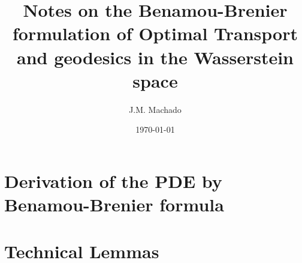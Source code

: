 \documentclass{amsart}
\title[]{Notes on the Benamou-Brenier formulation of Optimal Transport and geodesics in the Wasserstein space}
\author{J.M. Machado}
\date{\today}
\numberwithin{equation}{section}
\theoremstyle{definition}
\theoremstyle{remark}
\begin{document}
\begin{abstract}
	 
\end{abstract}
\maketitle

\section{Derivation of the PDE by Benamou-Brenier formula}
\label{section.PDE_Benamou_Brenier}


\appendix
\section{Technical Lemmas}
\label{appendix.technical_lemmas}


%






\end{document}
